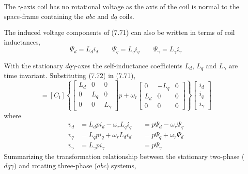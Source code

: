 \documentclass[a4paper,numbers=noenddot,12pt]{scrbook}
\begin{document}
    The $\gamma$-axis coil has no rotational voltage as the axis of the coil is normal to the space-frame containing the $abc$ and $dq$ coils.

    The induced voltage components of (7.71) can also be written in terms of coil inductances,
    \begin{equation}
        \varPsi_d = L_d i_d \qquad \varPsi_q = L_q i_q \qquad \varPsi_{\gamma} = L_{\gamma} i_{\gamma}
        \label{eq:Eq7.72}
    \end{equation}

    With the stationary $dq\gamma$-axes the self-inductance coefficients $L_d$, $L_q$ and $L_{\gamma}$ are time invariant. Substituting (7.72) in (7.71),
    \begin{equation}
        [v_{abc}] = [C_t]
        \left\{ 
            \begin{bmatrix}
                L_d & 0 & 0 \\
                0 & L_q & 0 \\
                0 & 0 & L_{\gamma}
            \end{bmatrix}
            p + \omega_r 
            \begin{bmatrix}
                0 & -L_q & 0 \\
                L_d & 0  & 0 \\
                0 & 0 & 0
            \end{bmatrix}
        \right\}
        \begin{bmatrix}
            i_d \\ i_q \\ i_{\gamma}
        \end{bmatrix}
        \label{eq:Eq7.73}
    \end{equation}
    where
    \begin{equation}
        \begin{aligned}
            v_d & = L_d p i_d - \omega_r L_q i_q && = p \varPsi_d - \omega_r \varPsi_q \\
            v_q & = L_q p i_q + \omega_r L_d i_d && = p \varPsi_q + \omega_r \varPsi_d \\
            v_{\gamma} & = L_{\gamma} p i_{\gamma} && = p \varPsi_{\gamma}
        \end{aligned}
        \label{eq:Eq7.74}
    \end{equation}
    Summarizing the transformation relationship between the stationary two-phase ($d q \gamma$) and rotating three-phase ($abc$) systems,
\end{document}
